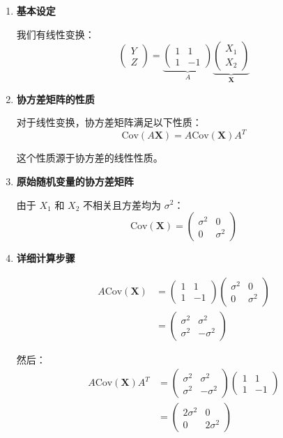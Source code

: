 \documentclass[UTF8]{report}
\theoremstyle{MyLineTheoremStyle} %
\theoremstyle{MyBlockTheoremStyle} %
\theoremstyle{MySubsubsectionStyle} %
\begin{document}
\begin{enumerate}
    \item \textbf{基本设定}
    
    我们有线性变换：
    $$
    \begin{pmatrix} Y \\ Z \end{pmatrix} = 
    \underbrace{\begin{pmatrix} 1 & 1 \\ 1 & -1 \end{pmatrix}}_{A}
    \underbrace{\begin{pmatrix} X_1 \\ X_2 \end{pmatrix}}_{\mathbf{X}}
    $$
    
    \item \textbf{协方差矩阵的性质}
    
    对于线性变换，协方差矩阵满足以下性质：
    $$\text{Cov}(A\mathbf{X}) = A\text{Cov}(\mathbf{X})A^T$$
    
    这个性质源于协方差的线性性质。
    
    \item \textbf{原始随机变量的协方差矩阵}
    
    由于 $X_1$ 和 $X_2$ 不相关且方差均为 $\sigma^2$：
    $$
    \text{Cov}(\mathbf{X}) = \begin{pmatrix} \sigma^2 & 0 \\ 0 & \sigma^2 \end{pmatrix}
    $$
    
    \item \textbf{详细计算步骤}
    
    \begin{align*}
    A\text{Cov}(\mathbf{X}) &= 
    \begin{pmatrix} 1 & 1 \\ 1 & -1 \end{pmatrix}
    \begin{pmatrix} \sigma^2 & 0 \\ 0 & \sigma^2 \end{pmatrix} \\
    &= \begin{pmatrix} \sigma^2 & \sigma^2 \\ \sigma^2 & -\sigma^2 \end{pmatrix}
    \end{align*}
    
    然后：
    \begin{align*}
    A\text{Cov}(\mathbf{X})A^T &= 
    \begin{pmatrix} \sigma^2 & \sigma^2 \\ \sigma^2 & -\sigma^2 \end{pmatrix}
    \begin{pmatrix} 1 & 1 \\ 1 & -1 \end{pmatrix} \\
    &= \begin{pmatrix} 2\sigma^2 & 0 \\ 0 & 2\sigma^2 \end{pmatrix}
    \end{align*}
    

\end{enumerate}
\end{document}
